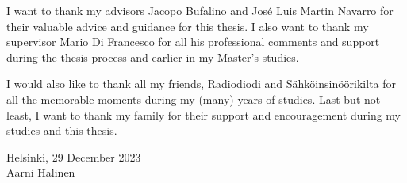 \documentclass[english, 12pt, a4paper, sci, utf8, a-2b, online]{aaltothesis}
\begin{document}
\newpage

\dothesispagenumbering{}


I want to thank my advisors Jacopo Bufalino and José Luis Martin Navarro for their valuable advice and guidance for this thesis.
I also want to thank my supervisor Mario Di Francesco for all his professional comments and support during the thesis process and earlier in my Master's studies.

I would also like to thank all my friends, Radiodiodi and Sähköinsinöörikilta for all the memorable moments during my (many) years of studies.
Last but not least, I want to thank my family for their support and encouragement during my studies and this thesis.

\vspace{5cm}
Helsinki, 29 December 2023 \\

\vspace{5mm}
{\hfill Aarni Halinen \hspace{1cm}}

\newpage

\thesistableofcontents

\end{document}

